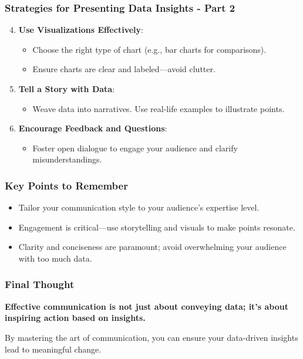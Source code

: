 \documentclass{beamer}
\begin{document}
\begin{frame}[fragile]
    \frametitle{Strategies for Presenting Data Insights - Part 2}
    \begin{enumerate}
        \setcounter{enumi}{3}
        \item \textbf{Use Visualizations Effectively}:
        \begin{itemize}
            \item Choose the right type of chart (e.g., bar charts for comparisons).
            \item Ensure charts are clear and labeled—avoid clutter.
        \end{itemize}
        \item \textbf{Tell a Story with Data}:
        \begin{itemize}
            \item Weave data into narratives. Use real-life examples to illustrate points.
        \end{itemize}
        \item \textbf{Encourage Feedback and Questions}:
        \begin{itemize}
            \item Foster open dialogue to engage your audience and clarify misunderstandings.
        \end{itemize}
    \end{enumerate}
\end{frame}

\begin{frame}[fragile]
    \frametitle{Key Points to Remember}
    \begin{itemize}
        \item Tailor your communication style to your audience's expertise level.
        \item Engagement is critical—use storytelling and visuals to make points resonate.
        \item Clarity and conciseness are paramount; avoid overwhelming your audience with too much data.
    \end{itemize}
\end{frame}

\begin{frame}[fragile]
    \frametitle{Final Thought}
    \begin{block}{}
        \textbf{Effective communication is not just about conveying data; it’s about inspiring action based on insights.}
    \end{block}
    By mastering the art of communication, you can ensure your data-driven insights lead to meaningful change.
\end{frame}
\end{document}
